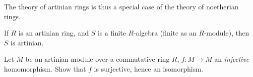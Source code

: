 The theory of artinian rings is thus a special case of the theory of noetherian
rings.

\begin{exercise} 
If $R$ is an artinian ring, and $S$ is a finite $R$-algebra (finite as an
$R$-module), then $S$ is artinian.
\end{exercise} 

\begin{exercise} 
Let $M$ be an artinian module over a commutative ring $R$, $f: M \to M$ an \emph{injective} homomorphism.
Show that $f$ is surjective, hence an isomorphism. 
\end{exercise} 
